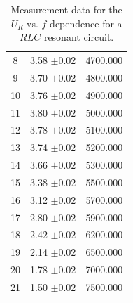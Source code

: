 \documentclass{article}
\begin{document}
\begin{table}[H]
\begin{tabular}{ccc}
        8                                                     & 3.58  $\pm 0.02$                                                              & 4700.000                  \\
        9                                                     & 3.70  $\pm 0.02$                                                              & 4800.000                  \\
        10                                                    & 3.76  $\pm 0.02$                                                              & 4900.000                  \\
        11                                                    & 3.80  $\pm 0.02$                                                              & 5000.000                  \\
        12                                                    & 3.78  $\pm 0.02$                                                              & 5100.000                  \\
        13                                                    & 3.74  $\pm 0.02$                                                              & 5200.000                  \\
        14                                                    & 3.66  $\pm 0.02$                                                              & 5300.000                  \\
        15                                                    & 3.38  $\pm 0.02$                                                              & 5500.000                  \\
        16                                                    & 3.12  $\pm 0.02$                                                              & 5700.000                  \\
        17                                                    & 2.80  $\pm 0.02$                                                              & 5900.000                  \\
        18                                                    & 2.42  $\pm 0.02$                                                              & 6200.000                  \\
        19                                                    & 2.14  $\pm 0.02$                                                              & 6500.000                  \\
        20                                                    & 1.78  $\pm 0.02$                                                              & 7000.000                  \\
        21                                                    & 1.50  $\pm 0.02$                                                              & 7500.000                  \\
        \bottomrule
    \end{tabular}
    \caption{Measurement data for the $U_R$ vs. $f$ dependence for a $RLC$ resonant circuit.}\label{TableResonant}
\end{table}
\end{document}
